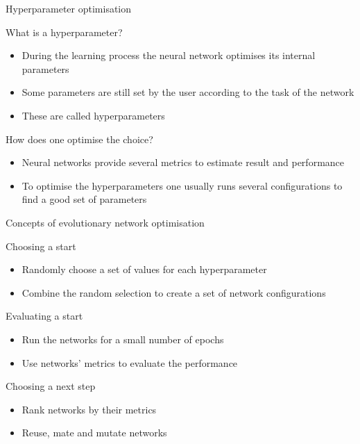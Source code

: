 \begin{frame}{Hyperparameter optimisation}
    \begin{block}{What is a hyperparameter?}
        \begin{itemize}
            \item During the learning process the neural network optimises its internal parameters
            \item Some parameters are still set by the user according to the task of the network
            \item These are called hyperparameters
        \end{itemize}
        
    \end{block}
    \begin{block}{How does one optimise the choice?}
        \begin{itemize}
            \item Neural networks provide several metrics to estimate result and performance
            \item To optimise the hyperparameters one usually runs several configurations to find a good set of parameters
        \end{itemize}
    \end{block}
\end{frame}


\begin{frame}{Concepts of evolutionary network optimisation}
    \begin{block}{Choosing a start}
        \begin{itemize}
            \item Randomly choose a set of values for each hyperparameter
            \item Combine the random selection to create a set of network configurations
        \end{itemize}
    \end{block}
    \begin{block}{Evaluating a start}
        \begin{itemize}
            \item Run the networks for a small number of epochs
            \item Use networks' metrics to evaluate the performance
        \end{itemize}
    \end{block}
    \begin{block}{Choosing a next step}
        \begin{itemize}
            \item Rank networks by their metrics
            \item Reuse, mate and mutate networks
        \end{itemize}
    \end{block}
\end{frame}

